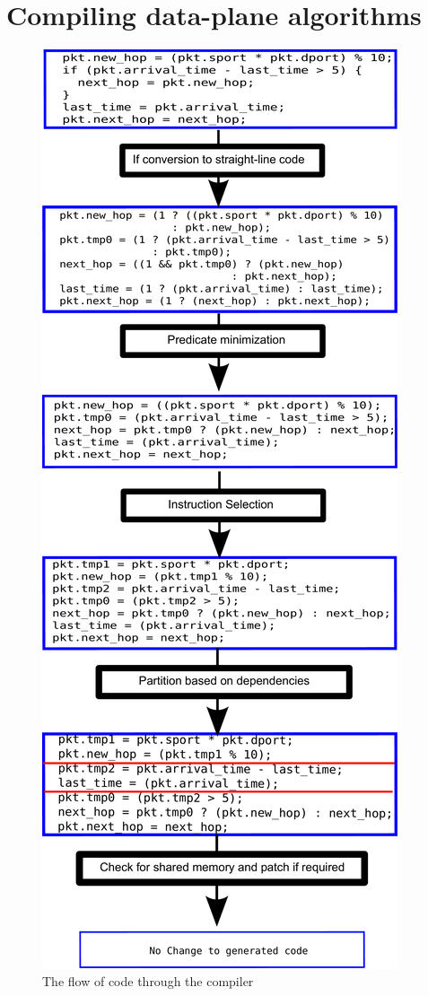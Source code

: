 \section{Compiling data-plane algorithms}
\label{s:compiler}

\begin{figure}
\includegraphics[width=\columnwidth]{compiler_flow.pdf}
\caption{The flow of code through the compiler}
\label{fig:flow}
\end{figure}


